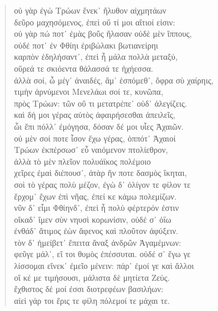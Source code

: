 \begin{Spacing}{1.5}
\begin{verse}
{\large\g  οὐ γὰρ ἐγὼ Τρώων ἕνεκ᾽ ἤλυθον αἰχμητάων  } \\
{\large\g  δεῦρο μαχησόμενος, ἐπεὶ οὔ τί μοι αἴτιοί εἰσιν:  } \\
{\large\g  οὐ γὰρ πώ ποτ᾽ ἐμὰς βοῦς ἤλασαν οὐδὲ μὲν ἵππους,  } \\
{\large\g  οὐδέ ποτ᾽ ἐν Φθίηι ἐριβώλακι βωτιανείρηι  } \\
{\large\g  καρπὸν ἐδηλήσαντ᾽, ἐπεὶ ἦ μάλα πολλὰ μεταξύ,  } \\
{\large\g  οὔρεά τε σκιόεντα θάλασσά τε ἠχήεσσα.  } \\
{\large\g  ἀλλὰ σοί, ὦ μέγ᾽ ἀναιδές, ἅμ᾽ ἑσπόμεθ᾽, ὄφρα σὺ χαίρηις,  } \\
{\large\g  τιμὴν ἀρνύμενοι Μενελάωι σοί τε, κυνῶπα,  } \\
{\large\g  πρὸς Τρώων: τῶν οὔ τι μετατρέπε᾽ οὐδ᾽ ἀλεγίζεις.  } \\
{\large\g  καὶ δή μοι γέρας αὐτὸς ἀφαιρήσεσθαι ἀπειλεῖς,  } \\
{\large\g  ὧι ἔπι πόλλ᾽ ἐμόγησα, δόσαν δέ μοι υἷες Ἀχαιῶν.  } \\
{\large\g οὐ μὲν σοί ποτε ἶσον ἔχω γέρας, ὁππότ᾽ Ἀχαιοί   } \\
{\large\g  Τρώων ἐκπέρσωσ᾽ εὖ ναιόμενον πτολίεθρον,  } \\
{\large\g  ἀλλὰ τὸ μὲν πλεῖον πολυάϊκος πολέμοιο  } \\
{\large\g  χεῖρες ἐμαὶ διέπουσ᾽, ἀτὰρ ἤν ποτε δασμὸς ἵκηται,  } \\
{\large\g  σοὶ τὸ γέρας πολὺ μέζον, ἐγὼ δ᾽ ὀλίγον τε φίλον τε  } \\
{\large\g  ἔρχομ᾽ ἔχων ἐπὶ νῆας, ἐπεί κε κάμω πολεμίζων.  } \\
{\large\g  νῦν δ᾽ εἶμι Φθίηνδ᾽, ἐπεὶ ἦ πολὺ φέρτερόν ἐστιν  } \\
{\large\g  οἴκαδ᾽ ἴμεν σὺν νηυσὶ κορωνίσιν, οὐδέ σ᾽ ὀΐω  } \\
{\large\g  ἐνθάδ᾽ ἄτιμος ἐὼν ἄφενος καὶ πλοῦτον ἀφύξειν.  } \\
{\large\g τὸν δ᾽ ἠμείβετ᾽ ἔπειτα ἄναξ ἀνδρῶν Ἀγαμέμνων:  } \\
{\large\g φεῦγε μάλ᾽, εἴ τοι θυμὸς ἐπέσσυται. οὐδέ σ᾽ ἔγω γε  } \\
{\large\g λίσσομαι εἵνεκ᾽ ἐμεῖο μένειν: πάρ᾽ ἐμοί γε καὶ ἄλλοι  } \\
{\large\g οἵ κέ με τιμήσουσι, μάλιστα δὲ μητίετα Ζεύς.  } \\
{\large\g ἔχθιστος δέ μοί ἐσσι διοτρεφέων βασιλήων:  } \\
{\large\g αἰεὶ γάρ τοι ἔρις τε φίλη πόλεμοί τε μάχαι τε.  } \\

\end{verse}
\end{Spacing}
